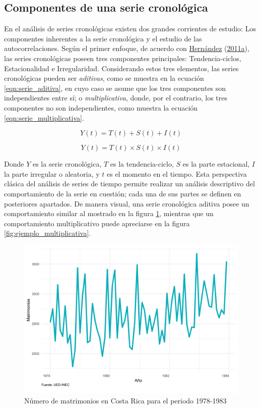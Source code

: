 \documentclass[
]{article}
\begin{document}
\subsection{Componentes de una serie cronológica}

En el análisis de series cronológicas existen dos grandes corrientes de
estudio: Los componentes inherentes a la serie cronológica y el estudio
de las autocorrelaciones. Según el primer enfoque, de acuerdo con
\protect\hyperlink{ref-oscarh-1}{Hernández}
(\protect\hyperlink{ref-oscarh-1}{2011a}), las series cronológicas
poseen tres componentes principales: Tendencia-ciclos, Estacionalidad e
Irregularidad. Considerando estos tres elementos, las series
cronológicas pueden ser \emph{aditivas}, como se muestra en la ecuación
\ref{eqn:serie_aditiva}, en cuyo caso se asume que los tres componentes
son independientes entre sí; o \emph{multiplicativa}, donde, por el
contrario, los tres componentes no son independientes, como muestra la
ecuación \ref{eqn:serie_multiplicativa}.

\begin{equation}
\label{eqn:serie_aditiva}
Y(t)=T(t)+S(t)+I(t)
\end{equation}

\begin{equation}
\label{eqn:serie_multiplicativa}
Y(t)=T(t)\times S(t)\times I(t)
\end{equation}

Donde \(Y\) es la serie cronológica, \(T\) es la tendencia-ciclo, \(S\)
es la parte estacional, \(I\) la parte irregular o aleatoria, y \(t\) es
el momento en el tiempo. Esta perspectiva clásica del análisis de series
de tiempo permite realizar un análisis descriptivo del comportamiento de
la serie en cuestión; cada una de sus partes se definen en posteriores
apartados. De manera visual, una serie cronológica aditiva posee un
comportamiento similar al mostrado en la figura
\ref{fig:ejemplo_aditiva}, mientras que un comportamiento multiplicativo
puede apreciarse en la figura \ref{fig:ejemplo_multiplicativa}.

\begin{figure}[!h]
\includegraphics[width=1\linewidth,height=1\textheight]{Tesis_files/figure-latex/ejemplo_aditiva-1} \caption{Número de matrimonios en Costa Rica para el periodo 1978-1983}\label{fig:ejemplo_aditiva}
\end{figure}
\end{document}
